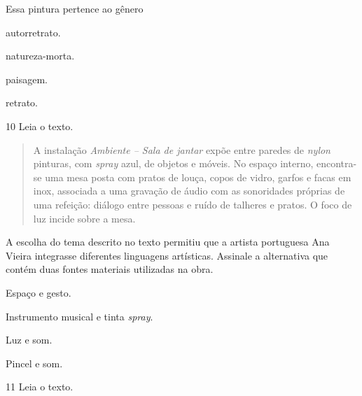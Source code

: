 

Essa pintura pertence ao gênero

\begin{escolha}
\item
  autorretrato.
\item
  natureza-morta.
\item
  paisagem.
\item
  retrato.
\end{escolha}


\pagebreak
\num{10} Leia o texto.

\begin{quote}
A instalação \emph{Ambiente -- Sala de jantar} expõe entre paredes de
\textit{nylon} pinturas, com \textit{spray} azul, de objetos e móveis. No espaço interno,
encontra-se uma mesa posta com pratos de louça, copos de vidro, garfos e
facas em inox, associada a uma gravação de áudio com as sonoridades
próprias de uma refeição: diálogo entre pessoas e ruído de talheres e
pratos. O foco de luz incide sobre a mesa.

\end{quote}

A escolha do tema descrito no texto permitiu que a
artista portuguesa Ana Vieira integrasse diferentes linguagens
artísticas. Assinale a alternativa que contém duas fontes materiais
utilizadas na obra.

\begin{escolha}
\item
  Espaço e gesto.
\item
  Instrumento musical e tinta \textit{spray}.
\item
  Luz e som.
\item
  Pincel e som.
\end{escolha}

\num{11} Leia o texto.

